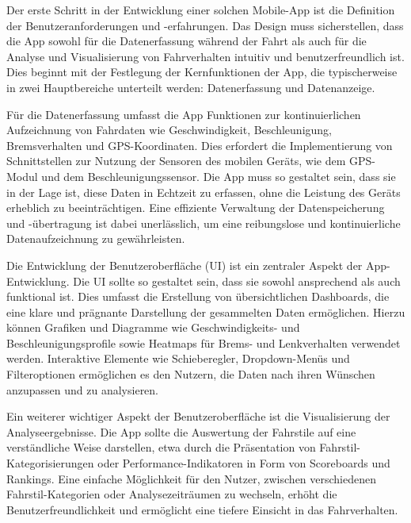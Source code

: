 \documentclass[oneside]{ausarbeitung}
\begin{document}
\begin{itemize}
  Der erste Schritt in der Entwicklung einer solchen Mobile-App ist die Definition der Benutzeranforderungen und -erfahrungen. Das Design 
  muss sicherstellen, dass die App sowohl für die Datenerfassung während der Fahrt als auch für die Analyse und Visualisierung von
  Fahrverhalten intuitiv und benutzerfreundlich ist. Dies beginnt mit der Festlegung der Kernfunktionen der App, die typischerweise in 
  zwei Hauptbereiche unterteilt werden: Datenerfassung und Datenanzeige.
  
  Für die Datenerfassung umfasst die App Funktionen zur kontinuierlichen Aufzeichnung von Fahrdaten wie Geschwindigkeit, Beschleunigung, 
  Bremsverhalten und GPS-Koordinaten. Dies erfordert die Implementierung von Schnittstellen zur Nutzung der Sensoren des mobilen Geräts, 
  wie dem GPS-Modul und dem Beschleunigungssensor. Die App muss so gestaltet sein, dass sie in der Lage ist, diese Daten in Echtzeit zu 
  erfassen, ohne die Leistung des Geräts erheblich zu beeinträchtigen. Eine effiziente Verwaltung der Datenspeicherung und -übertragung ist dabei unerlässlich, um eine reibungslose und kontinuierliche Datenaufzeichnung zu gewährleisten.
  
  Die Entwicklung der Benutzeroberfläche (UI) ist ein zentraler Aspekt der App-Entwicklung. Die UI sollte so gestaltet sein, dass sie 
  sowohl ansprechend als auch funktional ist. Dies umfasst die Erstellung von übersichtlichen Dashboards, die eine klare und prägnante 
  Darstellung der gesammelten Daten ermöglichen. Hierzu können Grafiken und Diagramme wie Geschwindigkeits- und Beschleunigungsprofile 
  sowie Heatmaps für Brems- und Lenkverhalten verwendet werden. Interaktive Elemente wie Schieberegler, Dropdown-Menüs und Filteroptionen ermöglichen es den Nutzern, die Daten nach ihren Wünschen anzupassen und zu analysieren.
  
  Ein weiterer wichtiger Aspekt der Benutzeroberfläche ist die Visualisierung der Analyseergebnisse. Die App sollte die Auswertung der 
  Fahrstile auf eine verständliche Weise darstellen, etwa durch die Präsentation von Fahrstil-Kategorisierungen oder Performance-Indikatoren 
  in Form von Scoreboards und Rankings. Eine einfache Möglichkeit für den Nutzer, zwischen verschiedenen Fahrstil-Kategorien oder 
  Analysezeiträumen zu wechseln, erhöht die Benutzerfreundlichkeit und ermöglicht eine tiefere Einsicht in das Fahrverhalten.
  

\end{itemize}
\end{document}
